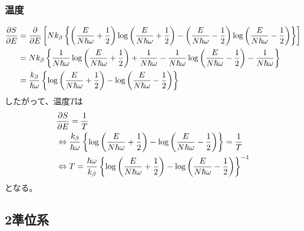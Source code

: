 \documentclass[dvipdfmx, 11pt, a4paper]{jsarticle}
\theoremstyle{definition}
\begin{document}
\subsubsection{温度}
    \begin{align}
        \frac{\partial S}{\partial E} &= \frac{\partial }{\partial E} \left[ Nk_\beta \left\{ \left( \frac{E}{N \hbar \omega} + \frac{1}{2} \right)\log \left( \frac{E}{N \hbar \omega} + \frac{1}{2} \right) - \left( \frac{E}{N \hbar \omega} - \frac{1}{2} \right)\log \left( \frac{E}{N \hbar \omega} - \frac{1}{2} \right) \right\} \right] \notag \\
        &= Nk_\beta \left\{ \frac{1}{N \hbar \omega} \log \left( \frac{E}{N \hbar \omega} + \frac{1}{2} \right) + \frac{1}{N\hbar \omega } - \frac{1}{N \hbar \omega} \log \left( \frac{E}{N \hbar \omega} - \frac{1}{2} \right) - \frac{1}{N\hbar \omega} \right\} \notag \\
        &= \frac{k_\beta}{ \hbar \omega} \left\{ \log \left( \frac{E}{N \hbar \omega} + \frac{1}{2} \right) - \log \left( \frac{E}{N \hbar \omega} - \frac{1}{2} \right) \right\} \notag
    \end{align}
    したがって、温度$T$は
    \begin{align}
        &\frac{\partial S}{\partial E} = \frac{1}{T} \notag \\
        &\Leftrightarrow \frac{k_\beta}{ \hbar \omega} \left\{ \log \left( \frac{E}{N \hbar \omega} + \frac{1}{2} \right) - \log \left( \frac{E}{N \hbar \omega} - \frac{1}{2} \right) \right\} = \frac{1}{T} \notag \\
        &\Leftrightarrow T = \frac{\hbar \omega}{k_\beta} \left\{ \log \left( \frac{E}{N \hbar \omega} + \frac{1}{2} \right) - \log \left( \frac{E}{N \hbar \omega} - \frac{1}{2} \right) \right\}^{-1}
    \end{align}
    となる。
\subsection{2準位系}
\end{document}
